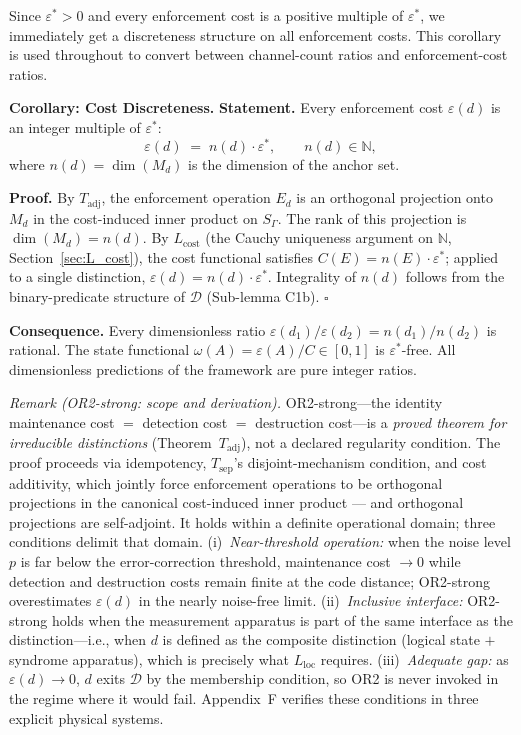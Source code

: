 \documentclass[11pt]{article}
\theoremstyle{remark}
\begin{document}
Since $\varepsilon^* > 0$ and every enforcement cost is a positive multiple of $\varepsilon^*$, we immediately get a discreteness structure on all enforcement costs.  This corollary is used throughout to convert between channel-count ratios and enforcement-cost ratios.


\medskip\noindent\textbf{Corollary: Cost Discreteness.}
\textbf{Statement.}  Every enforcement cost $\varepsilon(d)$ is an integer multiple of $\varepsilon^*$:
\[
\varepsilon(d) \;=\; n(d)\cdot\varepsilon^*, \qquad n(d) \in \mathbb{N},
\]
where $n(d) = \dim(M_d)$ is the dimension of the anchor set.

\smallskip\noindent\textbf{Proof.}  By $T_{\mathrm{adj}}$, the enforcement operation $E_d$ is an orthogonal projection onto $M_d$ in the cost-induced inner product on $S_\Gamma$.  The rank of this projection is $\dim(M_d) = n(d)$.  By $L_{\mathrm{cost}}$ (the Cauchy uniqueness argument on $\mathbb{N}$, Section~\ref{sec:L_cost}), the cost functional satisfies $C(E) = n(E)\cdot\varepsilon^*$; applied to a single distinction, $\varepsilon(d) = n(d)\cdot\varepsilon^*$.  Integrality of $n(d)$ follows from the binary-predicate structure of $\mathcal{D}$ (Sub-lemma C1b).  \hfill$\square$

\smallskip\noindent\textbf{Consequence.}  Every dimensionless ratio $\varepsilon(d_1)/\varepsilon(d_2) = n(d_1)/n(d_2)$ is rational.  The state functional $\omega(A) = \varepsilon(A)/C \in [0,1]$ is $\varepsilon^*$-free.  All dimensionless predictions of the framework are pure integer ratios.


\smallskip\noindent\textit{Remark (OR2-strong: scope and derivation).}
OR2-strong---the identity maintenance cost $=$ detection cost $=$ destruction cost---is a \emph{proved theorem for irreducible distinctions} (Theorem~$T_{\mathrm{adj}}$), not a declared regularity condition.  The proof proceeds via idempotency, $T_{\mathrm{sep}}$'s disjoint-mechanism condition, and cost additivity, which jointly force enforcement operations to be orthogonal projections in the canonical cost-induced inner product --- and orthogonal projections are self-adjoint.  It holds within a definite operational domain; three conditions delimit that domain.  (i)~\textit{Near-threshold operation:} when the noise level $p$ is far below the error-correction threshold, maintenance cost $\to 0$ while detection and destruction costs remain finite at the code distance; OR2-strong overestimates $\varepsilon(d)$ in the nearly noise-free limit.  (ii)~\textit{Inclusive interface:} OR2-strong holds when the measurement apparatus is part of the same interface as the distinction---i.e., when $d$ is defined as the composite distinction (logical state $+$ syndrome apparatus), which is precisely what $L_{\mathrm{loc}}$ requires.  (iii)~\textit{Adequate gap:} as $\varepsilon(d) \to 0$, $d$ exits $\mathcal{D}$ by the membership condition, so OR2 is never invoked in the regime where it would fail.  Appendix~F verifies these conditions in three explicit physical systems.
\end{document}
